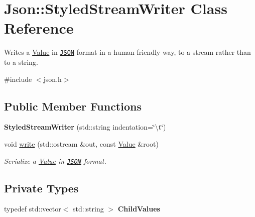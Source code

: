 \hypertarget{class_json_1_1_styled_stream_writer}{\section{Json\-:\-:Styled\-Stream\-Writer Class Reference}
\label{class_json_1_1_styled_stream_writer}
}


Writes a \hyperlink{class_json_1_1_value}{Value} in \href{http://www.json.org}{\tt J\-S\-O\-N} format in a human friendly way, to a stream rather than to a string.  




{\ttfamily \#include $<$json.\-h$>$}

\subsection*{Public Member Functions}
\begin{DoxyCompactItemize}
\item 
\hypertarget{class_json_1_1_styled_stream_writer_ae87567a08de865b6dc84d7218a3001df}{{\bfseries Styled\-Stream\-Writer} (std\-::string indentation=\char`\"{}\textbackslash{}t\char`\"{})}\label{class_json_1_1_styled_stream_writer_ae87567a08de865b6dc84d7218a3001df}

\item 
void \hyperlink{class_json_1_1_styled_stream_writer_a07807741c6c43ecd35885a87234d0805}{write} (std\-::ostream \&out, const \hyperlink{class_json_1_1_value}{Value} \&root)
\begin{DoxyCompactList}\small\item\em Serialize a \hyperlink{class_json_1_1_value}{Value} in \href{http://www.json.org}{\tt J\-S\-O\-N} format. \end{DoxyCompactList}\end{DoxyCompactItemize}
\subsection*{Private Types}
\begin{DoxyCompactItemize}
\item 
\hypertarget{class_json_1_1_styled_stream_writer_ad0e42dda934aaee87fa9434c30186a9b}{typedef std\-::vector$<$ std\-::string $>$ {\bfseries Child\-Values}}\label{class_json_1_1_styled_stream_writer_ad0e42dda934aaee87fa9434c30186a9b}

\end{DoxyCompactItemize}
